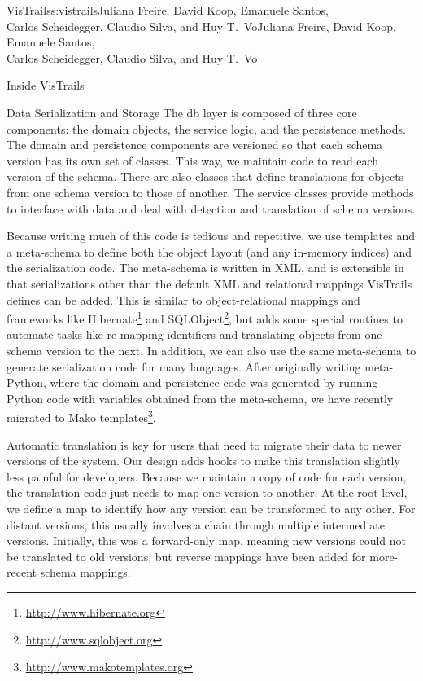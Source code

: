 \begin{aosachaptertoc}{VisTrails}{s:vistrails}{Juliana Freire, David Koop, Emanuele Santos, \\ Carlos Scheidegger, Claudio Silva, and Huy T.\ Vo}{Juliana Freire, David Koop, Emanuele Santos, \\ \hspace*{0.9cm} Carlos Scheidegger, Claudio Silva, and Huy T.\ Vo}
\begin{aosasect1}{Inside VisTrails}
\begin{aosasect2}{Data Serialization and Storage}
The db layer is composed of three core components: the domain objects,
the service logic, and the persistence methods.  The domain and
persistence components are versioned so that each schema version has
its own set of classes.  This way, we maintain code to read each
version of the schema.  There are also classes that define
translations for objects from one schema version to those of another.
The service classes provide methods to interface with data and deal
with detection and translation of schema versions.

Because writing much of this code is tedious and repetitive, we use
templates and a meta-schema to define both the object layout (and any
in-memory indices) and the serialization code.  The meta-schema is
written in XML, and is extensible in that serializations other than
the default XML and relational mappings VisTrails defines can be
added.  This is similar to object-relational mappings and frameworks
like Hibernate\footnote{\url{http://www.hibernate.org}} and
SQLObject\footnote{\url{http://www.sqlobject.org}}, but adds some
special routines to automate tasks like re-mapping identifiers and
translating objects from one schema version to the next.  In addition,
we can also use the same meta-schema to generate serialization code
for many languages.  After originally writing meta-Python, where the
domain and persistence code was generated by running Python code with
variables obtained from the meta-schema, we have recently migrated to
Mako templates\footnote{\url{http://www.makotemplates.org}}.

Automatic translation is key for users that need to migrate their data
to newer versions of the system.  Our design adds hooks to make this
translation slightly less painful for developers.  Because we maintain
a copy of code for each version, the translation code just needs to
map one version to another.  At the root level, we define a map to
identify how any version can be transformed to any other.  For distant
versions, this usually involves a chain through multiple intermediate
versions.  Initially, this was a forward-only map, meaning new
versions could not be translated to old versions, but reverse mappings
have been added for more-recent schema mappings.


\end{aosasect2}
\end{aosasect1}
\end{aosachaptertoc}
